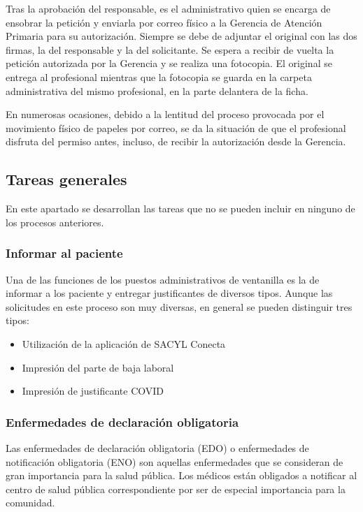 Tras la aprobación del responsable, es el administrativo quien se encarga de ensobrar la petición y enviarla por correo físico a la Gerencia de Atención Primaria para su autorización.
Siempre se debe de adjuntar el original con las dos firmas, la del responsable y la del solicitante.
Se espera a recibir de vuelta la petición autorizada por la Gerencia y se realiza una fotocopia.
El original se entrega al profesional mientras que la fotocopia se guarda en la carpeta administrativa del mismo profesional, en la parte delantera de la ficha.

En numerosas ocasiones, debido a la lentitud del proceso provocada por el movimiento físico de papeles por correo, se da la situación de que el profesional disfruta del permiso antes, incluso, de recibir la autorización desde la Gerencia.

\subsection{Tareas generales}

En este apartado se desarrollan las tareas que no se pueden incluir en ninguno de los procesos anteriores.

\subsubsection{Informar al paciente}

Una de las funciones de los puestos administrativos de ventanilla es la de informar a los paciente y entregar justificantes de diversos tipos. Aunque las solicitudes en este proceso son muy diversas, en general se pueden distinguir tres tipos:

\begin{itemize}
    \item Utilización de la aplicación de SACYL Conecta
    \item Impresión del parte de baja laboral
    \item Impresión de justificante COVID
\end{itemize}

\subsubsection{Enfermedades de declaración obligatoria}

Las enfermedades de declaración obligatoria (EDO) o enfermedades de notificación obligatoria (ENO) son aquellas enfermedades que se consideran de gran importancia para la salud pública. Los médicos están obligados a notificar al centro de salud pública correspondiente por ser de especial importancia para la comunidad.

